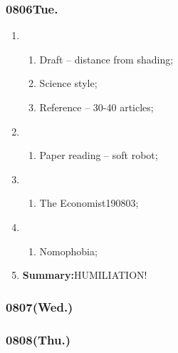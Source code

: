 \subsubsection{0806Tue.}
\begin{enumerate}
	\item \ncquaone
	\begin{enumerate}[(1)]
		\item Draft -- distance from shading;\rightundoneBlack
		\item Science style;\rightundoneBlack
		\item Reference -- 30-40 articles;\rightundoneBlack
	\end{enumerate}
	
	\item \ncquatwo	
	\begin{enumerate}[(1)]
		\item Paper reading -- soft robot;\rightundoneBlack
	\end{enumerate}
	
	\item \ncquathree
	\begin{enumerate}[(1)]
		\item The Economist190803;\rightundoneBlack
	\end{enumerate}
	
	\item \ncquafour	
	\begin{enumerate}[(1)]
		\item Nomophobia;\rightundoneBlack
	\end{enumerate}
	\item \textbf{Summary:}HUMILIATION! 
\end{enumerate}
\subsubsection{0807(Wed.)}
\subsubsection{0808(Thu.)}
